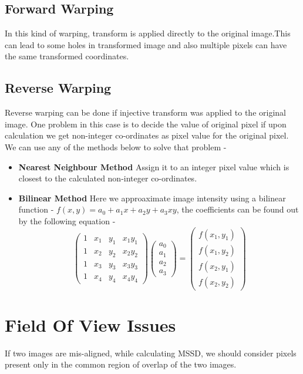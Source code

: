 \documentclass{report}
\begin{document}
\subsection{Forward Warping}
In this kind of warping, transform is applied directly to the original image.This can lead to some holes in transformed image and also multiple pixels can have the same transformed coordinates.
\subsection{Reverse Warping}
Reverse warping can be done if injective transform was applied to the original image. 
One problem in this case is to decide the value of original pixel if upon calculation we get non-integer co-ordinates as pixel value for the original pixel. We can use any of the methods below to solve that problem - 
\begin{itemize}
    \item \textbf{Nearest Neighbour Method} Assign it to an integer pixel value which is closest to the calculated non-integer co-ordinates.  
    \item \textbf{Bilinear Method} Here we approaximate image intensity using a bilinear function - $f(x,y) = a_0 + a_1x + a_2y + a_3xy $, the coefficients can be found out by the following equation - 
        \[
        \begin{pmatrix}
            1 & x_1 & y_1 & x_1y_1 \\
            1 & x_2 & y_2 & x_2y_2 \\
            1 & x_3 & y_3 & x_3y_3 \\
            1 & x_4 & y_4 & x_4y_4
        \end{pmatrix} 
        \begin{pmatrix}
            a_0 \\
            a_1 \\
            a_2 \\
            a_3
        \end{pmatrix}
        =
        \begin{pmatrix}
            f(x_1,y_1) \\
            f(x_1,y_2) \\
            f(x_2,y_1) \\
            f(x_2,y_2)
        \end{pmatrix}
        \]
\end{itemize}
\section{Field Of View Issues}
If two images are mis-aligned, while calculating MSSD, we should consider pixels present only in the common region of overlap of the two images.
\end{document}
